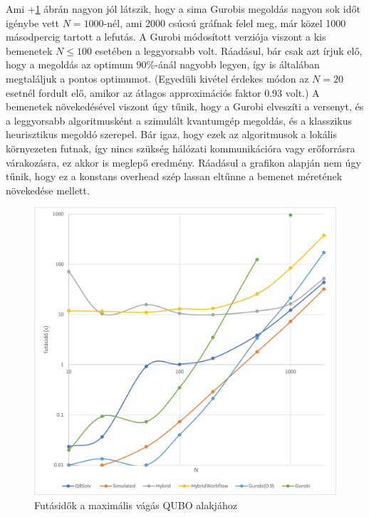 Ami \az+\ref{fig:maxCutQUBO} ábrán nagyon jól látszik, hogy a sima Gurobis megoldás nagyon sok időt igénybe vett $N=1000$-nél, ami 2000 csúcsú gráfnak felel meg, már közel 1000 másodpercig tartott a lefutás. A Gurobi módosított verziója viszont a kis bemenetek $N \leq 100$ esetében a leggyorsabb volt. Ráadásul, bár csak azt írjuk elő, hogy a megoldás az optimum 90\%-ánál nagyobb legyen, így is általában megtaláljuk a pontos optimumot. (Egyedüli kivétel érdekes módon az $N=20$ esetnél fordult elő, amikor az átlagos approximációs faktor 0.93 volt.)
A bemenetek növekedésével viszont úgy tűnik, hogy a Gurobi elveszíti a versenyt, és a leggyorsabb algoritmusként a szimulált kvantumgép megoldás, és a klasszikus heurisztikus megoldó szerepel. Bár igaz, hogy ezek az algoritmusok a lokális környezeten futnak, így nincs szükség hálózati kommunikációra vagy erőforrásra várakozásra, ez akkor is meglepő eredmény. Ráadásul a grafikon alapján nem úgy tűnik, hogy ez a konstans overhead szép lassan eltűnne a bemenet méretének növekedése mellett.


\begin{figure}[!ht]
	\centering
	\includegraphics[width=150mm, keepaspectratio]{figures/diagrams/maxCutQUBO.png}
	\caption{Futásidők a maximális vágás QUBO alakjához}
	\label{fig:maxCutQUBO}
\end{figure}

